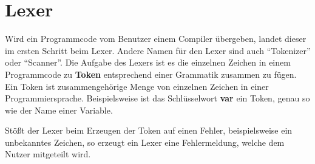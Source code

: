 \section{Lexer} \label{sec:lexer}
Wird ein Programmcode vom Benutzer einem Compiler übergeben, landet dieser im ersten Schritt beim Lexer. Andere Namen für den Lexer sind auch \enquote{Tokenizer} oder \enquote{Scanner}. Die Aufgabe des Lexers ist es die einzelnen Zeichen in einem Programmcode zu \textbf{Token} entsprechend einer Grammatik zusammen zu fügen. Ein Token ist zusammengehörige Menge von einzelnen Zeichen in einer Programmiersprache. Beispielsweise ist das Schlüsselwort \textbf{var} ein Token, genau so wie der Name einer Variable. 

Stößt der Lexer beim Erzeugen der Token auf einen Fehler, beispielsweise ein unbekanntes Zeichen, so erzeugt ein Lexer eine Fehlermeldung, welche dem Nutzer mitgeteilt wird.